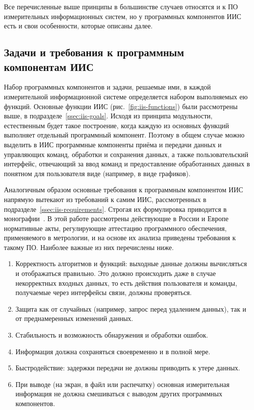 \documentclass[a4paper, 14pt, titlepage]{extarticle}
\begin{document}

  Все перечисленные выше принципы в большинстве случаев относятся и к ПО измерительных информационных
  систем, но у программных компонентов ИИС есть и свои особенности, которые описаны далее.


  \subsection{Задачи и требования к программным компонентам ИИС}

  Набор программных компонентов и задачи, решаемые ими, в каждой измерительной информационной
  системе определяется набором выполняемых ею функций.
  Основные функции ИИС (рис.~\ref{fig:iis-functions}) были рассмотрены выше, в подразделе~\ref{ssec:iis-goals}.
  Исходя из принципа модульности, естественным будет такое построение, когда каждую из основных функций выполняет
  отдельный программный компонент. Поэтому в общем случае можно выделить в ИИС программные
  компоненты приёма и передачи данных и управляющих команд, обработки и сохранения данных, а также
  пользовательский интерфейс, отвечающий за ввод команд и предоставление обработанных данных в
  понятном для пользователя виде (например, в виде графиков).

  Аналогичным образом основные требования к программным компонентом ИИС напрямую вытекают из
  требований к самим ИИС, рассмотренных в подразделе~\ref{ssec:iis-requirements}. Строгая их
  формулировка приводится в монографии~\cite{slaev-soft-cert}. В этой работе рассмотрены действующие
  в России и Европе нормативные акты, регулирующие аттестацию программного обеспечения, применяемого
  в метрологии, и на основе их анализа приведены требования к такому ПО. Наиболее важные из них
  перечислены ниже.

  \begin{enumerate}
    \item Корректность алгоритмов и функций: выходные данные должны вычисляться и отображаться
      правильно. Это должно происходить даже в случае некорректных входных данных, то есть действия
      пользователя и команды, получаемые через интерфейсы связи, должны проверяться.
    \item Защита как от случайных (например, запрос перед удалением данных), так и от преднамеренных
      изменений данных.
    \item Стабильность и возможность обнаружения и обработки ошибок.
    \item Информация должна сохраняться своевременно и в полной мере.
    \item Быстродействие: задержки передачи не должны приводить к утере данных.
    \item При выводе (на экран, в файл или распечатку) основная измерительная информация не должна
      смешиваться с выводом других программных компонентов.
  \end{enumerate}
\end{document}
